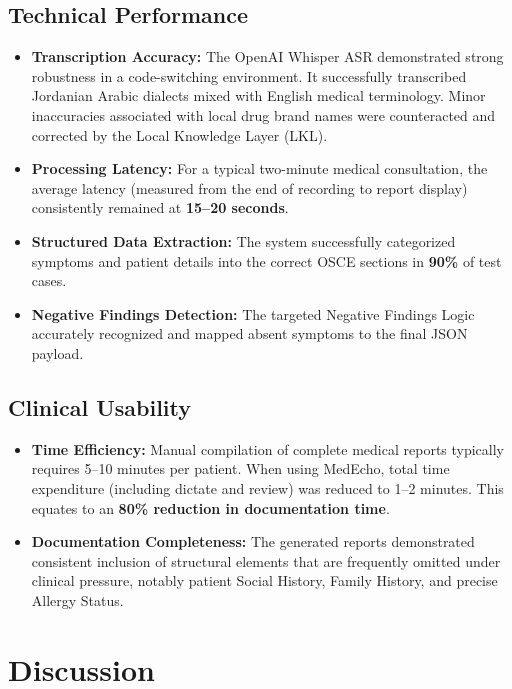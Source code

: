 \documentclass[12pt,a4paper]{article}
\begin{document}
\subsection{Technical Performance}
\begin{itemize}
    \item \textbf{Transcription Accuracy:} The OpenAI Whisper ASR demonstrated strong robustness in a code-switching environment. It successfully transcribed Jordanian Arabic dialects mixed with English medical terminology. Minor inaccuracies associated with local drug brand names were counteracted and corrected by the Local Knowledge Layer (LKL).
    \item \textbf{Processing Latency:} For a typical two-minute medical consultation, the average latency (measured from the end of recording to report display) consistently remained at \textbf{15--20 seconds}.
    \item \textbf{Structured Data Extraction:} The system successfully categorized symptoms and patient details into the correct OSCE sections in \textbf{90\%} of test cases.
    \item \textbf{Negative Findings Detection:} The targeted Negative Findings Logic accurately recognized and mapped absent symptoms to the final JSON payload.
\end{itemize}

\subsection{Clinical Usability}
\begin{itemize}
    \item \textbf{Time Efficiency:} Manual compilation of complete medical reports typically requires 5--10 minutes per patient. When using MedEcho, total time expenditure (including dictate and review) was reduced to 1--2 minutes. This equates to an \textbf{80\% reduction in documentation time}.
    \item \textbf{Documentation Completeness:} The generated reports demonstrated consistent inclusion of structural elements that are frequently omitted under clinical pressure, notably patient Social History, Family History, and precise Allergy Status.
\end{itemize}

\section{Discussion}
\end{document}
